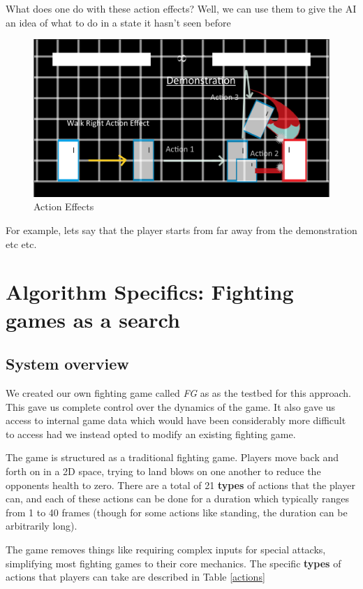 \documentclass{article}
\begin{document}
What does one do with these action effects? Well, we can use them to give the AI an idea of what to do in a state it hasn't seen before

\begin{figure}[t]
	\centering
	\includegraphics[width=\textwidth]{ActionEffect.png}
	\caption{Action Effects}
	\label{ActionEffects}
\end{figure}


For example, lets say that the player starts from far away from the demonstration etc etc.


\section{Algorithm Specifics: Fighting games as a search}

\subsection{System overview}
We created our own fighting game called \textit{FG} as as the testbed for this approach. This gave us complete control over the dynamics of the game. It also gave us access to internal game data which would have been considerably more difficult to access had we instead opted to modify an existing fighting game. 
	
The game is structured as a traditional fighting game. Players move back and forth on in a 2D space, trying to land blows on one another to reduce the opponents health to zero. There are a total of 21 \textbf{types} of actions that the player can, and each of these actions can be done for a duration which typically ranges from 1 to 40 frames (though for some actions like standing, the duration can be arbitrarily long). 
	
The game removes things like requiring complex inputs for special attacks, simplifying most fighting games to their core mechanics. The specific \textbf{types} of actions that players can take are described in Table \ref{actions}
\end{document}
